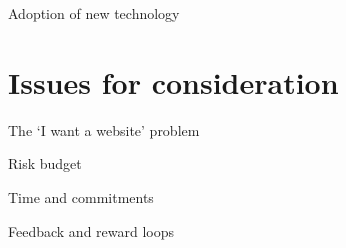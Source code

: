 \documentclass[aspectratio=1610, 11pt]{beamer} %
\begin{document}
\begin{frame}{Adoption of new technology}
\end{frame}



\section{Issues for consideration}
\begin{frame}{The `I want a website' problem}
\end{frame}
\begin{frame}{Risk budget}
\end{frame}
\begin{frame}{Time and commitments}
\end{frame}
\begin{frame}{Feedback and reward loops}
\end{frame}



  


  




  


  
\end{document}

